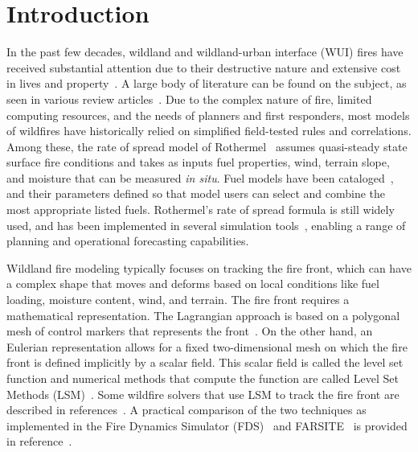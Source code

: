 \documentclass[journal,article,atmosphere,submit,moreauthors,pdftex]{Definitions/mdpi}
\begin{document}
\section{Introduction}

In the past few decades, wildland and wildland-urban interface (WUI) fires have received substantial attention due to their destructive nature and extensive cost in lives and property~\cite{thomas_2017,mcdermott_2019,richards_2020}. A large body of literature can be found on the subject, as seen in various review articles~\cite{Papadopoulos_2011,Bakhshaii_2019,mcdermott_2019}. Due to the complex nature of fire, limited computing resources, and the needs of planners and first responders, most models of wildfires have historically relied on simplified field-tested rules and correlations. Among these, the rate of spread model of Rothermel~\cite{Rothermel:1972} assumes quasi-steady state surface fire conditions and takes as inputs fuel properties, wind, terrain slope, and moisture that can be measured {\em in situ}. Fuel models have been cataloged~\cite{Anderson:1982}, and their parameters defined so that model users can select and combine the most appropriate listed fuels. Rothermel's rate of spread formula is still widely used, and has been implemented in several simulation tools~\cite{Finney:FARSITE,Bova:IJWF2015,FDS_Users_Guide,Coen:2,Coen:2015,LAUTENBERGER_2013,Coen:2013,Mandel:2009,Mandel:2011,Mandel:2014,Kochanski:2016}, enabling a range of planning and operational forecasting capabilities.

Wildland fire modeling typically focuses on tracking the fire front, which can have a complex shape that moves and deforms based on local conditions like fuel loading, moisture content, wind, and terrain. The fire front requires a mathematical representation. The Lagrangian approach is based on a polygonal mesh of control markers that represents the front~\cite{Finney:FARSITE,Bova:IJWF2015}. On the other hand, an Eulerian representation allows for a fixed two-dimensional mesh on which the fire front is defined implicitly by a scalar field. This scalar field is called the level set function and numerical methods that compute the function are called Level Set Methods (LSM)~\cite{Sethian:1999,Osher:2006}. Some wildfire solvers that use LSM to track the fire front are described in references~\cite{coen_2013,Bova:IJWF2015,FDS_Users_Guide,LAUTENBERGER_2013}. A practical comparison of the two techniques as implemented in the Fire Dynamics Simulator (FDS)~\cite{Mell:IJWF2007} and FARSITE~\cite{Finney:FARSITE} is provided in reference~\cite{Bova:IJWF2015}.
\end{document}
